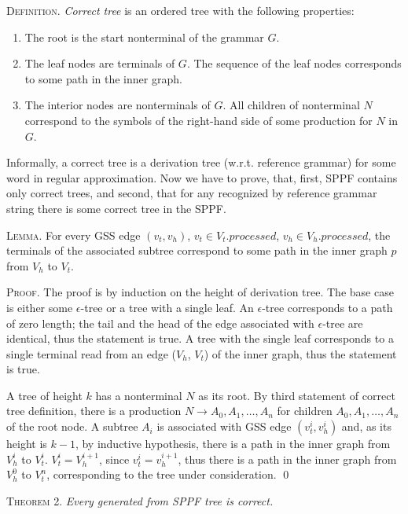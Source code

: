 \textsc{Definition.} 
\emph{Correct tree} is an ordered tree with the following properties:
\begin{enumerate}
  \item The root is the start nonterminal of the grammar $G$.
  \item The leaf nodes are terminals of $G$. The sequence of the leaf nodes 
        corresponds to some path in the inner graph. 
  \item The interior nodes are nonterminals of $G$. All children of nonterminal 
        $N$ correspond to the symbols of the right-hand side of some production for $N$ in $G$.
\end{enumerate}

Informally, a correct tree is a derivation tree (w.r.t. reference grammar) for some word in 
regular approximation. Now we have to prove, that, first, SPPF contains only correct trees, 
and second, that for any recognized by reference grammar string there is some correct tree in
the SPPF.

\textsc{Lemma.}
For every GSS edge $(v_{t}, v_{h})$, $v_{t} \in V_{t}.processed$, $v_{h} \in V_{h}.processed$, 
the terminals of the associated subtree correspond to some path in the inner graph $p$ 
from $V_{h}$ to $V_{t}$.

\textsc{Proof.}
The proof is by induction on the height of derivation tree. 
The base case is either some $\epsilon$-tree or a tree with a single leaf. An $\epsilon$-tree corresponds 
to a path of zero length; the tail and the head of the edge associated with $\epsilon$-tree are identical, 
thus the statement is true. A tree with the single leaf corresponds to a single terminal read from an edge 
($V_{h}$, $V_{t}$) of the inner graph, thus the statement is true.

A tree of height $k$ has a nonterminal $N$ as its root. By third statement of correct tree definition, 
there is a production $N \rightarrow A_{0}, A_{1}, \dots, A_{n}$ for children $A_{0}, A_{1}, \dots, A_{n}$ of the root node. 
A subtree $A_{i}$ is associated with GSS edge $(v_{t}^{i}, v_{h}^{i})$ and, as its height is $k-1$, by inductive hypothesis,
there is a path in the inner graph from $V_{h}^{i}$ to $V_{t}^{i}$. $V_{t}^i = V_{h}^{i+1}$, since $v_{t}^i = v_{h}^{i+1}$, 
thus there is a path in the inner graph from $V_{h}^{0}$ to $V_{t}^{n}$, corresponding to the tree under consideration.
\qed

\textsc{Theorem 2.} 
\textit{Every generated from SPPF tree is correct.}

